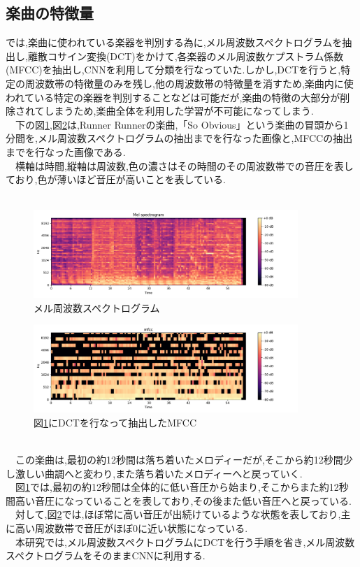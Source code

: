 \documentclass[twocolumn,twoside,9.5pt]{jarticle}
\begin{document}
\subsection{楽曲の特徴量}
\cite{deep}では,楽曲に使われている楽器を判別する為に,メル周波数スペクトログラムを抽出し,離散コサイン変換(DCT)をかけて,各楽器のメル周波数ケプストラム係数(MFCC)を抽出し,CNNを利用して分類を行なっていた.しかし,DCTを行うと,特定の周波数帯の特徴量のみを残し,他の周波数帯の特徴量を消すため,楽曲内に使われている特定の楽器を判別することなどは可能だが,楽曲の特徴の大部分が削除されてしまうため,楽曲全体を利用した学習が不可能になってしまう.\\
　下の図\ref{f1},図\ref{f2}は,Runner Runnerの楽曲,「So Obvious」という楽曲の冒頭から1分間を,メル周波数スペクトログラムの抽出までを行なった画像と,MFCCの抽出までを行なった画像である.\\
　横軸は時間,縦軸は周波数,色の濃さはその時間のその周波数帯での音圧を表しており,色が薄いほど音圧が高いことを表している.\\\
\begin{figure}[htbp]
	\includegraphics[width=100mm]{pic/melsample.pdf}
	\caption{メル周波数スペクトログラム}
	\label{f1}
\end{figure}
\begin{figure}[htbp]
	\includegraphics[width=100mm]{pic/mfccsample.pdf}
	\caption{図\ref{f1}にDCTを行なって抽出したMFCC}
	\label{f2}
\end{figure}
\\
　この楽曲は,最初の約12秒間は落ち着いたメロディーだが,そこから約12秒間少し激しい曲調へと変わり,また落ち着いたメロディーへと戻っていく.\\
　図\ref{f1}では,最初の約12秒間は全体的に低い音圧から始まり,そこからまた約12秒間高い音圧になっていることを表しており,その後また低い音圧へと戻っている.\\
　対して,図\ref{f2}では,ほぼ常に高い音圧が出続けているような状態を表しており,主に高い周波数帯で音圧がほぼ0に近い状態になっている.\\
　本研究では,メル周波数スペクトログラムにDCTを行う手順を省き,メル周波数スペクトログラムをそのままCNNに利用する.
\end{document}
